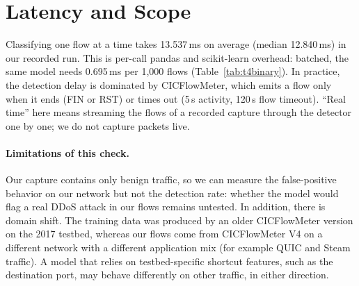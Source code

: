 \begin{table}[ht]
	\centering\small
	
	\caption{Real-time run on \texttt{task2\_lab2.pcap\_Flow.csv}.}
	\label{tab:t5rt}
\end{table}


\section{Latency and Scope}\label{sec:latency}

Classifying one flow at a time takes 13.537\,ms on average (median 12.840\,ms) in our recorded run. This is per-call pandas and scikit-learn overhead: batched, the same model needs 0.695\,ms per 1,000 flows (Table~\ref{tab:t4binary}). In practice, the detection delay is dominated by CICFlowMeter, which emits a flow only when it ends (FIN or RST) or times out (5\,s activity, 120\,s flow timeout). ``Real time'' here means streaming the flows of a recorded capture through the detector one by one; we do not capture packets live.

\paragraph{Limitations of this check.} Our capture contains only benign traffic, so we can measure the false-positive behavior on our network but not the detection rate: whether the model would flag a real DDoS attack in our flows remains untested. In addition, there is domain shift. The training data was produced by an older CICFlowMeter version on the 2017 testbed, whereas our flows come from CICFlowMeter V4 on a different network with a different application mix (for example QUIC and Steam traffic). A model that relies on testbed-specific shortcut features, such as the destination port, may behave differently on other traffic, in either direction.

\FloatBarrier
